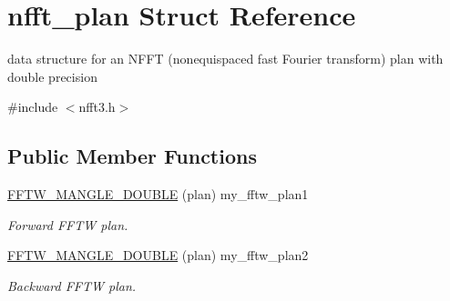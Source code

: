 \hypertarget{structnfft__plan}{\section{nfft\-\_\-plan Struct Reference}
\label{structnfft__plan}
}


data structure for an N\-F\-F\-T (nonequispaced fast Fourier transform) plan with double precision  




{\ttfamily \#include $<$nfft3.\-h$>$}

\subsection*{Public Member Functions}
\begin{DoxyCompactItemize}
\item 
\hypertarget{structnfft__plan_a2310e54f3049b94d2bf08b67f689280c}{\hyperlink{structnfft__plan_a2310e54f3049b94d2bf08b67f689280c}{F\-F\-T\-W\-\_\-\-M\-A\-N\-G\-L\-E\-\_\-\-D\-O\-U\-B\-L\-E} (plan) my\-\_\-fftw\-\_\-plan1}\label{structnfft__plan_a2310e54f3049b94d2bf08b67f689280c}

\begin{DoxyCompactList}\small\item\em Forward F\-F\-T\-W plan. \end{DoxyCompactList}\item 
\hypertarget{structnfft__plan_a02f777d558f0f4a3417000200472f1a9}{\hyperlink{structnfft__plan_a02f777d558f0f4a3417000200472f1a9}{F\-F\-T\-W\-\_\-\-M\-A\-N\-G\-L\-E\-\_\-\-D\-O\-U\-B\-L\-E} (plan) my\-\_\-fftw\-\_\-plan2}\label{structnfft__plan_a02f777d558f0f4a3417000200472f1a9}

\begin{DoxyCompactList}\small\item\em Backward F\-F\-T\-W plan. \end{DoxyCompactList}\end{DoxyCompactItemize}
